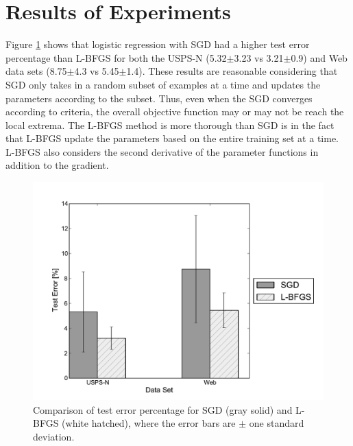 \documentclass[10pt]{article}
\begin{document}
\section{Results of Experiments}
\label{sec:results}

Figure \ref{fig:test_error} shows that logistic regression with SGD had a higher test error percentage than L-BFGS for both the USPS-N (5.32$\pm$3.23 vs 3.21$\pm$0.9) and Web data sets (8.75$\pm$4.3 vs 5.45$\pm$1.4). These results are reasonable considering that SGD only takes in a random subset of examples at a time and updates the parameters according to the subset. Thus, even when the SGD converges according to criteria, the overall objective function may or may not be reach the local extrema. The L-BFGS method is more thorough than SGD is in the fact that L-BFGS update the parameters based on the entire training set at a time. L-BFGS also considers the second derivative of the parameter functions in addition to the gradient.   

\begin{figure}[h]
\begin{center}
    \includegraphics[width=1.0\textwidth]{test_error.pdf}
    \caption{Comparison of test error percentage for SGD (gray solid) and L-BFGS (white hatched), where the error bars are $\pm$ one standard deviation.}
    \label{fig:test_error}
\end{center}
\end{figure}
\end{document}
